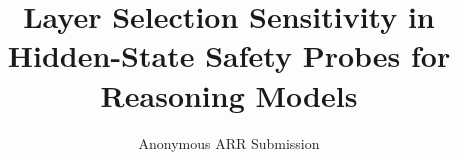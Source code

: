 \documentclass[11pt]{article}
\title{Layer Selection Sensitivity in Hidden-State Safety Probes for Reasoning Models}
\author{Anonymous ARR Submission}
\begin{document}
\maketitle

\begin{abstract}

\end{abstract}


















\end{document}

